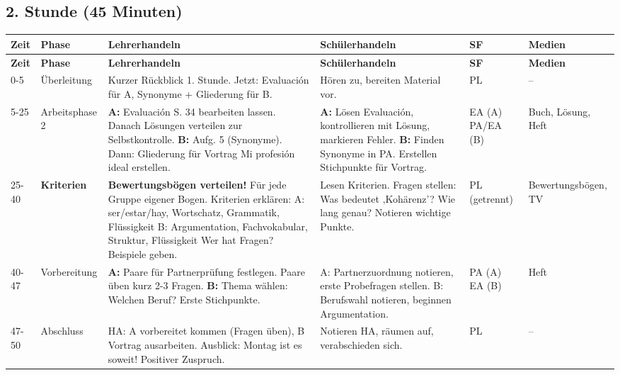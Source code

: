 \documentclass[11pt, a4paper]{article}
\begin{document}
\subsection{2. Stunde (45 Minuten)}

\small
\begin{longtable}{|p{1.2cm}|p{1.8cm}|p{3.5cm}|p{3.5cm}|p{1.2cm}|p{1.5cm}|}
    \hline
    \textbf{Zeit} & \textbf{Phase} & \textbf{Lehrerhandeln} & \textbf{Schülerhandeln} & \textbf{SF} & \textbf{Medien} \\
    \hline
    \endfirsthead
    \hline
    \textbf{Zeit} & \textbf{Phase} & \textbf{Lehrerhandeln} & \textbf{Schülerhandeln} & \textbf{SF} & \textbf{Medien} \\
    \hline
    \endhead

    0-5 & Überleitung & Kurzer Rückblick 1. Stunde. \glqq{}Jetzt: Evaluación für A, Synonyme + Gliederung für B.\grqq{} & Hören zu, bereiten Material vor. & PL & -- \\
    \hline

    5-25 & Arbeits\-phase 2 & \textbf{A:} Evaluación S. 34 bearbeiten lassen. Danach Lösungen verteilen zur Selbstkontrolle. \newline \textbf{B:} Aufg. 5 (Synonyme). Dann: Gliederung für Vortrag \glqq{}Mi profesión ideal\grqq{} erstellen. & \textbf{A:} Lösen Evaluación, kontrollieren mit Lösung, markieren Fehler. \newline \textbf{B:} Finden Synonyme in PA. Erstellen Stichpunkte für Vortrag. & EA (A) PA/EA (B) & Buch, Lösung, Heft \\
    \hline

    25-40 & \cellcolor{hellgrau}\textbf{Kriterien} & \cellcolor{hellgrau}\textbf{Bewertungsbögen verteilen!} \newline Für jede Gruppe eigener Bogen. Kriterien erklären: \newline A: ser/estar/hay, Wortschatz, Grammatik, Flüssigkeit \newline B: Argumentation, Fachvokabular, Struktur, Flüssigkeit \newline \glqq{}Wer hat Fragen?\grqq{} Beispiele geben. & Lesen Kriterien. Fragen stellen: \glqq{}Was bedeutet ‚Kohärenz'?\grqq{} \glqq{}Wie lang genau?\grqq{} Notieren wichtige Punkte. & PL (getrennt) & Bewertungs\-bögen, TV \\
    \hline

    40-47 & Vorbereitung & \textbf{A:} Paare für Partnerprüfung festlegen. Paare üben kurz 2-3 Fragen. \newline \textbf{B:} Thema wählen: Welchen Beruf? Erste Stichpunkte. & A: Partnerzuordnung notieren, erste Probefragen stellen. \newline B: Berufswahl notieren, beginnen Argumentation. & PA (A) EA (B) & Heft \\
    \hline

    47-50 & Abschluss & HA: A vorbereitet kommen (Fragen üben), B Vortrag ausarbeiten. Ausblick: \glqq{}Montag ist es soweit!\grqq{} Positiver Zuspruch. & Notieren HA, räumen auf, verabschieden sich. & PL & -- \\
    \hline
\end{longtable}
\normalsize
\end{document}
